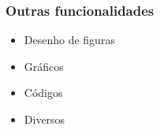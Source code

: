 \begin{frame}[fragile] \frametitle{Outras funcionalidades}
\begin{itemize}
	\item Desenho de figuras
	\item Gráficos
	\item Códigos
	\item Diversos
\end{itemize}
\end{frame}


